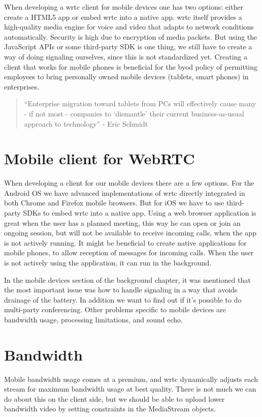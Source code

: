 When developing a \gls{wrtc} client for mobile devices one has two options: either create a HTML5 app or embed \gls{wrtc} into a native app. \gls{wrtc} itself provides a high-quality media engine for voice and video that adapts to network conditions automatically. Security is high due to encryption of media packets. But using the JavaScript APIs or some third-party SDK is one thing, we still have to create a way of doing signaling ourselves, since this is not standardized yet. Creating a client that works for mobile phones is beneficial for the \gls{byod} policy of permitting employees to bring personally owned mobile devices (tablets, smart phones) in enterprises.

\begin{quote}
``Enterprise migration toward tablets from PCs will effectively cause many - if not most - companies to `dismantle' their current business-as-usual approach to technology'' - Eric Schmidt
\end{quote}


\section{Mobile client for WebRTC}
When developing a client for our mobile devices there are a few options. For the Android OS we have advanced implementations of \gls{wrtc} directly integrated in both Chrome and Firefox mobile browsers. But for iOS we have to use third-party SDKs to embed \gls{wrtc} into a native app. Using a web browser application is great when the user has a planned meeting, this way he can open or join an ongoing session, but will not be available to receive incoming calls, when the app is not actively running. It might be beneficial to create native applications for mobile phones, to allow reception of messages for incoming calls. When the user is not actively using the application, it can run in the background.

In the mobile devices section of the background chapter, it was mentioned that the most important issue was how to handle signaling in a way that avoids drainage of the battery. In addition we want to find out if it's possible to do multi-party conferencing. Other problems specific to mobile devices are bandwidth usage, processing limitations, and sound echo.

\section{Bandwidth}
Mobile bandwidth usage comes at a premium, and \gls{wrtc} dynamically adjusts each stream for maximum bandwidth usage at best quality. There is not much we can do about this on the client side, but we should be able to upload lower bandwidth video by setting constraints in the MediaStream objects. 


